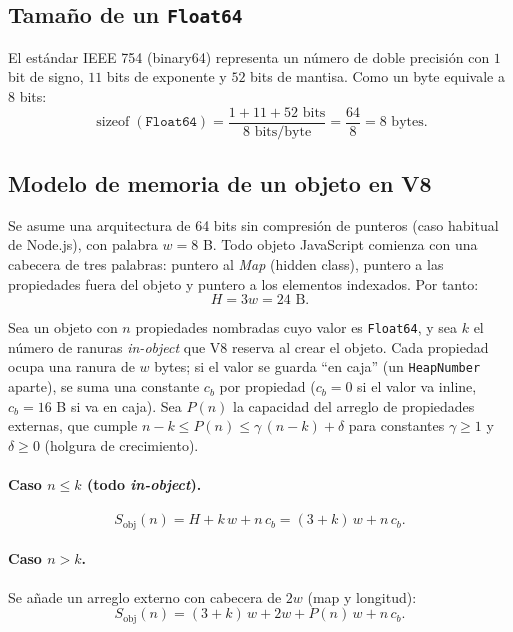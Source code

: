 
\subsection{Tamaño de un \texttt{Float64}}

El estándar IEEE 754 (binary64) representa un número de doble precisión con
$1$ bit de signo, $11$ bits de exponente y $52$ bits de mantisa. Como un byte
equivale a $8$ bits:
\[
  \operatorname{sizeof}(\texttt{Float64})
  = \frac{1 + 11 + 52 \text{ bits}}{8 \text{ bits/byte}}
  = \frac{64}{8} = 8 \text{ bytes}.
\]

\subsection{Modelo de memoria de un objeto en V8}

Se asume una arquitectura de 64 bits sin compresión de punteros (caso habitual
de Node.js), con palabra $w = 8$ B. Todo objeto JavaScript comienza con una
cabecera de tres palabras: puntero al \emph{Map} (hidden class), puntero a las
propiedades fuera del objeto y puntero a los elementos indexados. Por tanto:
\[
  H = 3w = 24 \text{ B}.
\]

Sea un objeto con $n$ propiedades nombradas cuyo valor es \texttt{Float64}, y
sea $k$ el número de ranuras \emph{in-object} que V8 reserva al crear el
objeto. Cada propiedad ocupa una ranura de $w$ bytes; si el valor se guarda
``en caja'' (un \texttt{HeapNumber} aparte), se suma una constante
$c_b$ por propiedad ($c_b = 0$ si el valor va inline, $c_b = 16$ B si va en
caja). Sea $P(n)$ la capacidad del arreglo de propiedades externas, que cumple
$n-k \le P(n) \le \gamma\,(n-k) + \delta$ para constantes $\gamma \ge 1$ y
$\delta \ge 0$ (holgura de crecimiento).

\paragraph{Caso $n \le k$ (todo \emph{in-object}).}
\[
  S_{\mathrm{obj}}(n) = H + k\,w + n\,c_b = (3+k)\,w + n\,c_b .
\]

\paragraph{Caso $n > k$.} Se añade un arreglo externo con cabecera de $2w$
(map y longitud):
\[
  S_{\mathrm{obj}}(n) = (3+k)\,w + 2w + P(n)\,w + n\,c_b .
\]

